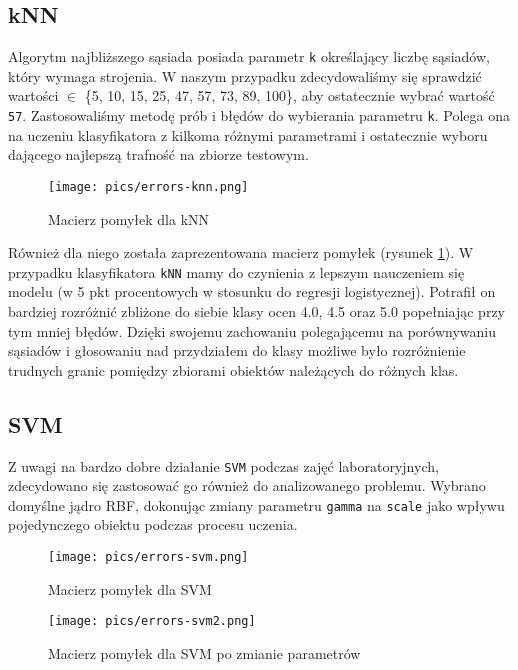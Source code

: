 \documentclass{article}
\begin{document}
\subsection{kNN}
Algorytm najbliższego sąsiada posiada parametr \texttt{k} określający liczbę sąsiadów, który wymaga strojenia. W naszym przypadku zdecydowaliśmy się sprawdzić wartości $\in$ \{5, 10, 15, 25, 47, 57, 73, 89, 100\}, aby ostatecznie wybrać wartość \texttt{57}. Zastosowaliśmy metodę prób i błędów do wybierania parametru \texttt{k}. Polega ona na uczeniu klasyfikatora z kilkoma różnymi parametrami i ostatecznie wyboru dającego najlepszą trafność na zbiorze testowym.

\begin{figure}[!h]
\centering
    \texttt{[image: pics/errors-knn.png]}
    \caption{Macierz pomyłek dla kNN}
    \label{fig:errors-knn}
\end{figure}

Również dla niego została zaprezentowana macierz pomyłek (rysunek \ref{fig:errors-knn}). W przypadku klasyfikatora \texttt{kNN} mamy do czynienia z lepszym nauczeniem się modelu (w 5 pkt procentowych w stosunku do regresji logistycznej). Potrafił on bardziej rozróżnić zbliżone do siebie klasy ocen 4.0, 4.5 oraz 5.0 popełniając przy tym mniej błędów. Dzięki swojemu zachowaniu polegającemu na porównywaniu sąsiadów i głosowaniu nad przydziałem do klasy możliwe było rozróżnienie trudnych granic pomiędzy zbiorami obiektów należących do różnych klas.

\subsection{SVM}
Z uwagi na bardzo dobre działanie \texttt{SVM} podczas zajęć laboratoryjnych, zdecydowano się zastosować go również do analizowanego problemu. Wybrano domyślne jądro RBF, dokonując zmiany parametru \texttt{gamma} na \texttt{scale} jako wpływu pojedynczego obiektu podczas procesu uczenia.

\begin{figure}[!h]
\centering
    \texttt{[image: pics/errors-svm.png]}
    \caption{Macierz pomyłek dla SVM}
    \label{fig:errors-svm}
\end{figure}

\begin{figure}[!h]
\centering
    \texttt{[image: pics/errors-svm2.png]}
    \caption{Macierz pomyłek dla SVM po zmianie parametrów}
    \label{fig:errors-svm2}
\end{figure}
\end{document}
